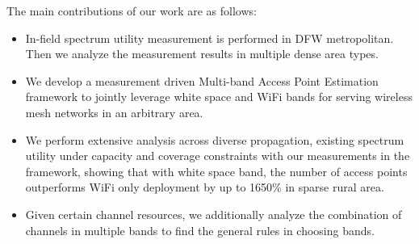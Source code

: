 The main contributions of our work are as follows:
\begin{itemize}
\item In-field spectrum utility measurement is performed in DFW metropolitan.
 Then we analyze the measurement results in multiple dense area types.
\item We develop a measurement driven Multi-band Access Point Estimation framework 
to jointly leverage white space and WiFi bands for serving wireless mesh networks in an arbitrary area.  
\item We perform extensive analysis across diverse propagation, existing spectrum utility under capacity
 and coverage constraints with our measurements in the framework, showing that with white space band, 
 the number of access points outperforms WiFi only deployment by up to 1650\% in sparse rural area.
\item Given certain channel resources, we additionally analyze the combination of channels in multiple bands 
to find the general rules in choosing bands. 
\end{itemize}


